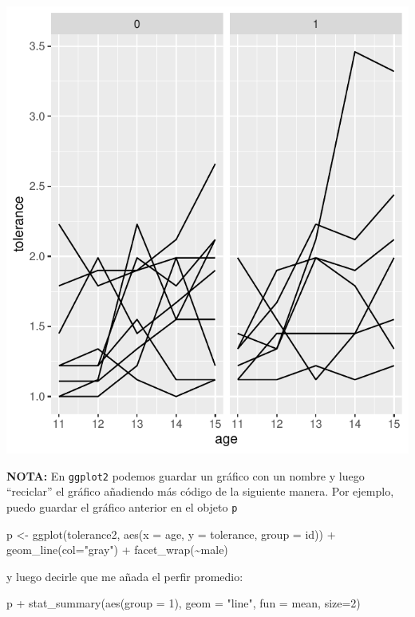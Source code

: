 \documentclass[
]{book}
\newenvironment{Shaded}{\begin{snugshade}}{\end{snugshade}}
\newcommand{\AttributeTok}[1]{\textcolor[rgb]{0.77,0.63,0.00}{#1}}
\newcommand{\DecValTok}[1]{\textcolor[rgb]{0.00,0.00,0.81}{#1}}
\newcommand{\FunctionTok}[1]{\textcolor[rgb]{0.00,0.00,0.00}{#1}}
\newcommand{\NormalTok}[1]{#1}
\newcommand{\OtherTok}[1]{\textcolor[rgb]{0.56,0.35,0.01}{#1}}
\newcommand{\SpecialCharTok}[1]{\textcolor[rgb]{0.00,0.00,0.00}{#1}}
\newcommand{\StringTok}[1]{\textcolor[rgb]{0.31,0.60,0.02}{#1}}
\begin{document}
\includegraphics{fig_out/unnamed-chunk-41-1.pdf}

\textbf{NOTA:} En \texttt{ggplot2} podemos guardar un gráfico con un nombre y luego ``reciclar'' el gráfico añadiendo más código de la siguiente manera. Por ejemplo, puedo guardar el gráfico anterior en el objeto \texttt{p}

\begin{Shaded}
\begin{Highlighting}[]
\NormalTok{p }\OtherTok{\textless{}{-}} \FunctionTok{ggplot}\NormalTok{(tolerance2, }\FunctionTok{aes}\NormalTok{(}\AttributeTok{x =}\NormalTok{ age, }\AttributeTok{y =}\NormalTok{ tolerance, }\AttributeTok{group =}\NormalTok{ id)) }\SpecialCharTok{+}
  \FunctionTok{geom\_line}\NormalTok{(}\AttributeTok{col=}\StringTok{"gray"}\NormalTok{) }\SpecialCharTok{+}
  \FunctionTok{facet\_wrap}\NormalTok{(}\SpecialCharTok{\textasciitilde{}}\NormalTok{male)}
\end{Highlighting}
\end{Shaded}

y luego decirle que me añada el perfir promedio:

\begin{Shaded}
\begin{Highlighting}[]
\NormalTok{p }\SpecialCharTok{+} \FunctionTok{stat\_summary}\NormalTok{(}\FunctionTok{aes}\NormalTok{(}\AttributeTok{group =} \DecValTok{1}\NormalTok{),}
    \AttributeTok{geom =} \StringTok{"line"}\NormalTok{, }\AttributeTok{fun =}\NormalTok{ mean, }\AttributeTok{size=}\DecValTok{2}\NormalTok{)}
\end{Highlighting}
\end{Shaded}
\end{document}
